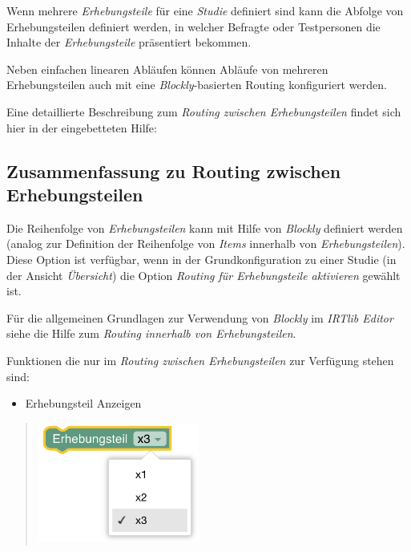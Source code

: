 \documentclass[
  letterpaper,
  DIV=11]{scrreprt}
\providecommand{\tightlist}{%
  \setlength{\itemsep}{0pt}\setlength{\parskip}{0pt}}\usepackage{longtable,booktabs,array}
\begin{document}
Wenn mehrere \emph{Erhebungsteile} für eine \emph{Studie} definiert sind
kann die Abfolge von Erhebungsteilen definiert werden, in welcher
Befragte oder Testpersonen die Inhalte der \emph{Erhebungsteile}
präsentiert bekommen.

Neben einfachen linearen Abläufen können Abläufe von mehreren
Erhebungsteilen auch mit eine \emph{Blockly}-basierten Routing
konfiguriert werden.

Eine detaillierte Beschreibung zum \emph{Routing zwischen
Erhebungsteilen} findet sich hier in der eingebetteten Hilfe:

\begin{tcolorbox}[enhanced jigsaw, colbacktitle=quarto-callout-tip-color!10!white, coltitle=black, colframe=quarto-callout-tip-color-frame, leftrule=.75mm, breakable, opacitybacktitle=0.6, toprule=.15mm, title=\textcolor{quarto-callout-tip-color}{\faLightbulb}\hspace{0.5em}{Eingebettete Programmhilfe}, colback=white, titlerule=0mm, arc=.35mm, bottomtitle=1mm, toptitle=1mm, rightrule=.15mm, bottomrule=.15mm, left=2mm, opacityback=0]

\hypertarget{zusammenfassung-zu-routing-zwischen-erhebungsteilen-1}{%
\subsection{Zusammenfassung zu Routing zwischen
Erhebungsteilen}\label{zusammenfassung-zu-routing-zwischen-erhebungsteilen-1}}

Die Reihenfolge von \emph{Erhebungsteilen} kann mit Hilfe von
\emph{Blockly} definiert werden (analog zur Definition der Reihenfolge
von \emph{Items} innerhalb von \emph{Erhebungsteilen}). Diese Option ist
verfügbar, wenn in der Grundkonfiguration zu einer Studie (in der
Ansicht \emph{Übersicht}) die Option \emph{Routing für Erhebungsteile
aktivieren} gewählt ist.

Für die allgemeinen Grundlagen zur Verwendung von \emph{Blockly} im
\emph{IRTlib Editor} siehe die Hilfe zum \emph{Routing innerhalb von
Erhebungsteilen}.

Funktionen die nur im \emph{Routing zwischen Erhebungsteilen} zur
Verfügung stehen sind:

\begin{itemize}
\tightlist
\item
  Erhebungsteil Anzeigen
\end{itemize}

\begin{quote}
\includegraphics[width=2.08333in,height=\textheight]{img/screenshot-blockly-request-study-part-01-DEU.png}
\end{quote}


\end{tcolorbox}
\end{document}
